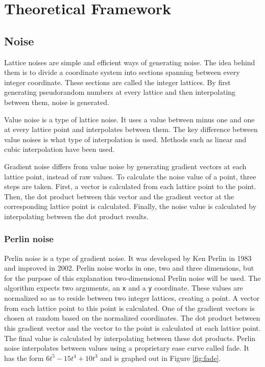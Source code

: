 \section{Theoretical Framework}
	\subsection{Noise}
		Lattice noises are simple and efficient ways of generating noise\cite{TexturingModeling}. The idea behind them is to divide a coordinate system into sections spanning between every integer coordinate. These sections are called the integer lattices. By first generating pseudorandom numbers at every lattice and then interpolating between them, noise is generated.
		
		\par
		Value noise is a type of lattice noise. It uses a value between minus one and one at every lattice point and interpolates between them. The key difference between value noises is what type of interpolation is used. Methods such as linear and cubic interpolation have been used\cite{TexturingModeling}.
		
		\par
		Gradient noise differs from value noise by generating gradient vectors at each lattice point, instead of raw values. To calculate the noise value of a point, three steps are taken. First, a vector is calculated from each lattice point to the point.  Then, the dot product between this vector and the gradient vector at the corresponding lattice point is calculated. Finally, the noise value is calculated by interpolating between the dot product results.
		
		\subsubsection{Perlin noise}
		Perlin noise is a type of gradient noise. It was developed by Ken Perlin in 1983 and improved in 2002\cite{PerlinNoise}. Perlin noise works in one, two and three dimensions, but for the purpose of this explanation two-dimensional Perlin noise will be used. The algorithm expects two arguments, an \texttt{x} and a \texttt{y} coordinate. These values are normalized so as to reside between two integer lattices, creating a point. A vector from each lattice point to this point is calculated. One of the gradient vectors is chosen at random based on the normalized coordinates. The dot product between this gradient vector and the vector to the point is calculated at each lattice point. The final value is calculated by interpolating between these dot products. Perlin noise interpolates between values using a proprietary ease curve called fade. It has the form \begin{math}6t^5-15t^4+10t^3\end{math} and is graphed out in Figure \ref{fig:fade}.
		
